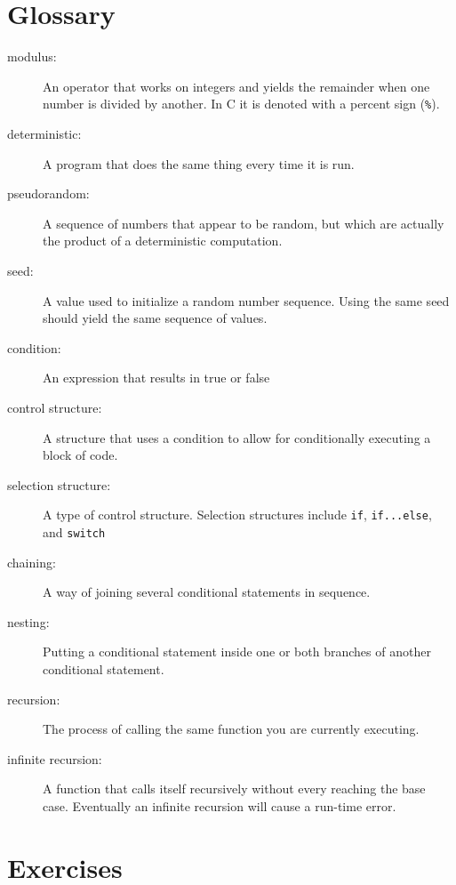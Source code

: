 \section{Glossary}

\begin{description}

\item[modulus:]  An operator that works on integers and yields
the remainder when one number is divided by another.  In C
it is denoted with a percent sign ({\tt \%}).

\item[deterministic:]  A program that does the same thing every
time it is run.

\item[pseudorandom:]  A sequence of numbers that appear to be
random, but which are actually the product of a deterministic
computation.

\item[seed:]  A value used to initialize a random number sequence.
Using the same seed should yield the same sequence of values.

\item[condition:]  An expression that results in true or false


\item[control structure:]  A structure that uses a condition to allow for conditionally executing a block of code. 

\item[selection structure:]  A type of control structure. Selection structures include {\tt if}, {\tt if...else}, and {\tt switch}

\item[chaining:]  A way of joining several conditional statements
in sequence.

\item[nesting:] Putting a conditional statement inside one or both
branches of another conditional statement.

\item[recursion:]  The process of calling the same function you
are currently executing.

\item[infinite recursion:]  A function that calls itself
recursively without every reaching the base case.  Eventually
an infinite recursion will cause a run-time error.


\end{description}


\section{Exercises}
\setcounter{exercisenum}{0}




